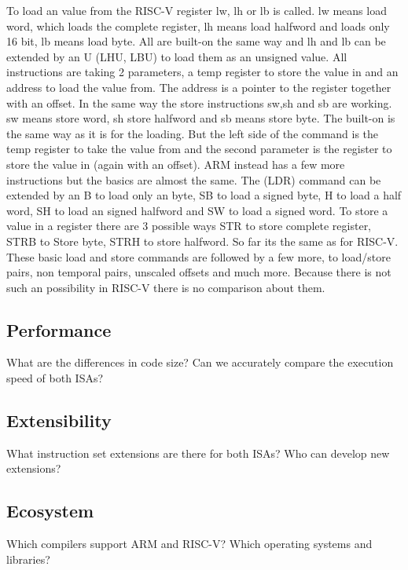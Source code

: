 \documentclass[conference]{IEEEtran}
\begin{document}
To load an value from the RISC-V register lw, lh or lb is called. lw means load word, which loads the complete register, lh means load halfword and loads only 16 bit, lb means load byte. All are built-on the same way and lh and lb can be extended by an U (LHU, LBU) to load them as an unsigned value. All instructions are taking 2 parameters, a temp register to store the value in and an address to load the value from. The address is a pointer to the register together with an offset.
In the same way the store instructions sw,sh and sb are working. sw means store word, sh store halfword and sb means store byte. The built-on is the same way as it is for the loading. But the left side of the command is the temp register to take the value from and the second parameter is the register to store the value in (again with an offset). \cite{Asanovic2016}
ARM instead has a few more instructions but the basics are almost the same. The (LDR) command can be extended by an B to load only an byte, SB to load a signed byte, H to load a half word, SH to load an signed halfword and SW to load a signed word. To store a value in a register there are 3 possible ways STR to store complete register, STRB to Store byte, STRH to store halfword. So far its the same as for RISC-V. These basic load and store commands are followed by a few more, to load/store pairs, non temporal pairs, unscaled offsets and much more. Because there is not such an possibility in RISC-V there is no comparison about them. \cite{ArmManual}


	\subsection{Performance}
	What are the differences in code size? Can we accurately compare the execution speed of both ISAs?
	\subsection{Extensibility}
	What instruction set extensions are there for both ISAs? Who can develop new extensions?
	\subsection{Ecosystem}
	Which compilers support ARM and RISC-V? Which operating systems and libraries?
\end{document}

